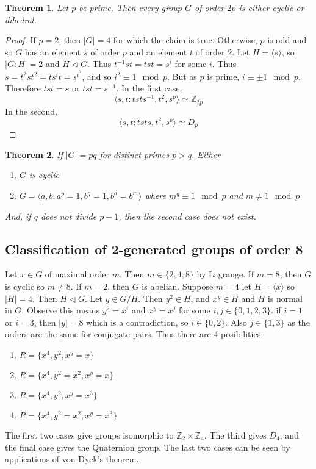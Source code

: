 \documentclass[a4paper,10pt]{article}
\newcommand{\ZZ}{\mathbb{Z}}
\newtheorem{thm}{Theorem}
\begin{document}
\begin{thm}
Let $p$ be prime. Then every group $G$ of order $2p$ is either cyclic or dihedral. 
\end{thm}

\begin{proof}
If $p = 2$, then $|G| = 4$ for which the claim is true. Otherwise, $p$ is odd and so $G$ has an element $s$ of order $p$ and an element $t$ of order $2$. Let $H = \langle s \rangle$, so $|G:H| = 2$ and $H \triangleleft G$. Thus $t^{-1} s t = tst = s^i$ for some $i$. Thus $s = t^2 s t^2 = t s^i t = s^{i^2}$, and so $i^2 \equiv 1 \mod p$. But as $p$ is prime, $i \equiv \pm 1 \mod p$. Therefore $tst = s$ or $tst = s^{-1}$. In the first case, 
\[ \langle s,t : tsts^{-1}, t^2, s^p \rangle \simeq \ZZ_{2p} \]
In the second, 
\[ \langle s,t : tsts, t^2, s^p \rangle \simeq D_p \]
\end{proof}

\begin{thm}
If $|G| = pq$ for distinct primes $p > q$. Either
\begin{enumerate}
\item $G$ is cyclic 
\item $G = \langle a,b : a^p = 1, b^q = 1, b^a = b^m \rangle$ where $m^q \equiv 1 \mod p$ and $m \neq 1 \mod p$
\end{enumerate}
And, if $q$ does not divide $p - 1$, then the second case does not exist. 
\end{thm}


\subsection{Classification of 2-generated groups of order 8}
Let $x \in G$ of maximal order $m$. Then $m \in \{ 2,4,8 \}$ by Lagrange. If $m = 8$, then $G$ is cyclic so $m \neq 8$. If $m = 2$, then $G$ is abelian. Suppose $m = 4$ let $H = \langle x \rangle$ so $|H| = 4$. Then $H \triangleleft G$. Let $y \in G / H$. Then $y^2 \in H$, and $x^y \in H$ and $H$ is normal in $G$. Observe this means $y^2 = x^i$ and $x^y = x^j$ for some $i,j \in \{0,1,2,3\}$. if $i = 1$ or $i = 3$, then $|y| = 8$ which is a contradiction, so $i \in \{0,2\}$. Also $j \in \{1,3\}$ as the orders are the same for conjugate pairs. Thus there are 4 posibilities:
\begin{enumerate}
\item $R = \{ x^4, y^2, x^y = x\}$ 
\item $R = \{ x^4, y^2 = x^2, x^y = x\}$ 
\item $R = \{ x^4, y^2, x^y = x^3\}$ 
\item $R = \{ x^4, y^2 = x^2, x^y = x^3\}$ 
\end{enumerate}
The first two cases give groups isomorphic to $\ZZ_2 \times \ZZ_4$. The third gives $D_4$, and the final case gives the Quaternion group. The last two cases can be seen by applications of von Dyck's theorem. 
 
\end{document}
